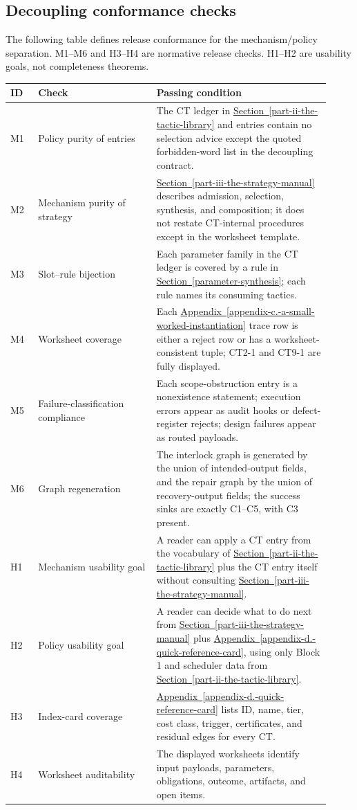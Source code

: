 \documentclass[
  11pt,
]{article}
\theoremstyle{definition}
\newcommand{\secref}[1]{\hyperref[#1]{Section~\ref*{#1}}}
\newcommand{\appref}[1]{\hyperref[#1]{Appendix~\ref*{#1}}}
\begin{document}
\subsection{Decoupling conformance checks}\label{decoupling-verification-checks}

The following table defines release conformance for the mechanism/policy
separation. M1--M6 and H3--H4 are normative release checks. H1--H2 are
usability goals, not completeness theorems.

\begingroup
\small
\setlength{\tabcolsep}{2pt}
\begin{longtable}[]{@{}
  >{\raggedright\arraybackslash}p{0.08\linewidth}
  >{\raggedright\arraybackslash}p{0.34\linewidth}
  >{\raggedright\arraybackslash}p{0.50\linewidth}@{}}
\toprule\noalign{}
ID & Check & Passing condition \\
\midrule\noalign{}
\endhead
\bottomrule\noalign{}
\endlastfoot
M1 & Policy purity of entries & The CT ledger in \secref{part-ii-the-tactic-library} and entries contain no selection advice except the quoted forbidden-word list in the decoupling contract. \\
M2 & Mechanism purity of strategy & \secref{part-iii-the-strategy-manual} describes admission, selection, synthesis, and composition; it does not restate CT-internal procedures except in the worksheet template. \\
M3 & Slot--rule bijection & Each parameter family in the CT ledger is covered by a rule in \secref{parameter-synthesis}; each rule names its consuming tactics. \\
M4 & Worksheet coverage & Each \appref{appendix-c.-a-small-worked-instantiation} trace row is either a reject row or has a worksheet-consistent tuple; CT2-1 and CT9-1 are fully displayed. \\
M5 & Failure-classification compliance & Each scope-obstruction entry is a nonexistence statement; execution errors appear as audit hooks or defect-register rejects; design failures appear as routed payloads. \\
M6 & Graph regeneration & The interlock graph is generated by the union of intended-output fields, and the repair graph by the union of recovery-output fields; the success sinks are exactly C1--C5, with C3 present. \\
H1 & Mechanism usability goal & A reader can apply a CT entry from the vocabulary of \secref{part-ii-the-tactic-library} plus the CT entry itself without consulting \secref{part-iii-the-strategy-manual}. \\
H2 & Policy usability goal & A reader can decide what to do next from \secref{part-iii-the-strategy-manual} plus \appref{appendix-d.-quick-reference-card}, using only Block 1 and scheduler data from \secref{part-ii-the-tactic-library}. \\
H3 & Index-card coverage & \appref{appendix-d.-quick-reference-card} lists ID, name, tier, cost class, trigger, certificates, and residual edges for every CT. \\
H4 & Worksheet auditability & The displayed worksheets identify input payloads, parameters, obligations, outcome, artifacts, and open items. \\
\end{longtable}
\endgroup
\end{document}
